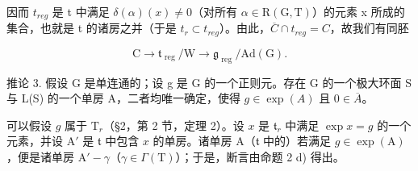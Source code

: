 因而 \(t_{reg}\) 是 t 中满足 \(\delta(\alpha)(x) \neq 0\)（对所有 \(\alpha \in \mathrm{R}(\mathrm{G}, \mathrm{T})\)）的元素 x 所成的集合，也就是 t 的诸房之并（于是 \(t_r \subset t_{reg}\)）。由此，\(\overline{C} \cap t_{reg} = C\)，故我们有同胚

\[
\mathrm{C} \rightarrow \mathfrak {t} _ {\text { reg }} / \mathrm{W} \rightarrow \mathfrak {g} _ {\text { reg }} / \mathrm{Ad} (\mathrm{G}).
\]

推论 3. 假设 G 是单连通的；设 g 是 G 的一个正则元。存在 G 的一个极大环面 S 与 L(S) 的一个单房 A，二者均唯一确定，使得 \(g \in \exp(A)\) 且 \(0 \in \overline{A}\)。

可以假设 \(g\) 属于 \(\mathrm{T}_r\)（§2，第 2 节，定理 2）。设 \(x\) 是 \(\mathfrak{t}_r\) 中满足 \(\exp x = g\) 的一个元素，并设 \(\mathrm{A}'\) 是 \(\mathfrak{t}\) 中包含 \(x\) 的单房。诸单房 \(\mathrm{A}\)（\(\mathfrak{t}\) 中的）若满足 \(g \in \exp(\mathrm{A})\)，便是诸单房 \(\mathrm{A}' - \gamma\)（\(\gamma \in \Gamma(\mathrm{T})\)）；于是，断言由命题 2 d) 得出。

